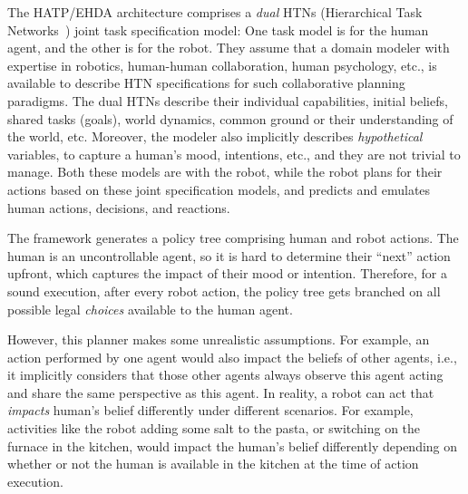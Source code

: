 \documentclass[letterpaper]{article} %
\begin{document}
The HATP/EHDA architecture comprises a \textit{dual} HTNs (Hierarchical Task Networks~\cite{naubooks0014222}) joint task specification model: One task model is for the human agent, and the other is for the robot. 
They assume that a domain modeler with expertise in robotics, human-human collaboration, human psychology, etc., is available to describe HTN specifications for such collaborative planning paradigms. 
The dual HTNs describe their individual capabilities, initial beliefs, shared tasks (goals), world dynamics, common ground or their understanding of the world, etc. Moreover, the modeler also implicitly describes \textit{hypothetical} variables, to capture a human's mood, intentions, etc., and they are not trivial to manage. 
Both these models are with the robot, while the robot plans for their actions based on these joint specification models, and predicts and emulates human actions, decisions, and reactions.    

The framework generates a policy tree comprising human and robot actions. 
The human is an uncontrollable agent,
so it is hard to determine their ``next'' action upfront, which captures the impact of their mood or intention.
Therefore, for a sound execution, after every robot action, the policy tree gets branched on all possible legal \textit{choices} available to the human agent.

However, this planner makes some unrealistic assumptions. For example, an action performed by one agent would also impact the beliefs of other agents, i.e., it implicitly considers that those other agents always observe this agent acting and share the same perspective as this agent. 
In reality, a robot can act that \textit{impacts} human's belief differently under different scenarios. For example, activities like the robot adding some salt to the pasta, or switching on the furnace in the kitchen, would impact the human's belief differently depending on whether or not the human is available in the kitchen at the time of action execution.   
\end{document}
